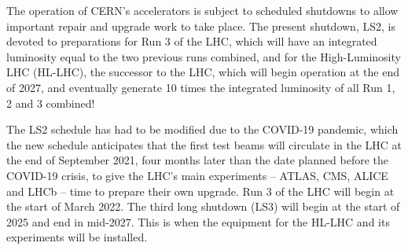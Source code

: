 The operation of CERN’s accelerators is subject to scheduled shutdowns 
to allow important repair and upgrade work to take place. 
The present shutdown, LS2, is devoted to preparations for Run 3 of the LHC, 
which will have an integrated luminosity equal to the two previous runs combined, 
and for the High-Luminosity LHC (HL-LHC), 
the successor to the LHC, which will begin operation at the end of 2027,
and eventually generate 10 times the integrated luminosity of
all Run 1, 2 and 3 combined!

The LS2 schedule has had to be modified due to the COVID-19 pandemic, 
which the new schedule anticipates that the first test beams will 
circulate in the LHC 
at the end of September 2021, four months later than the date 
planned before the COVID-19 crisis, 
to give the LHC’s main experiments – ATLAS, CMS, ALICE and LHCb – 
time to prepare their own upgrade. 
Run 3 of the LHC will begin at the start of March 2022.
The third long shutdown (LS3) will begin at the 
start of 2025 and end in mid-2027. 
This is when the equipment for the HL-LHC and 
its experiments will be installed. 
